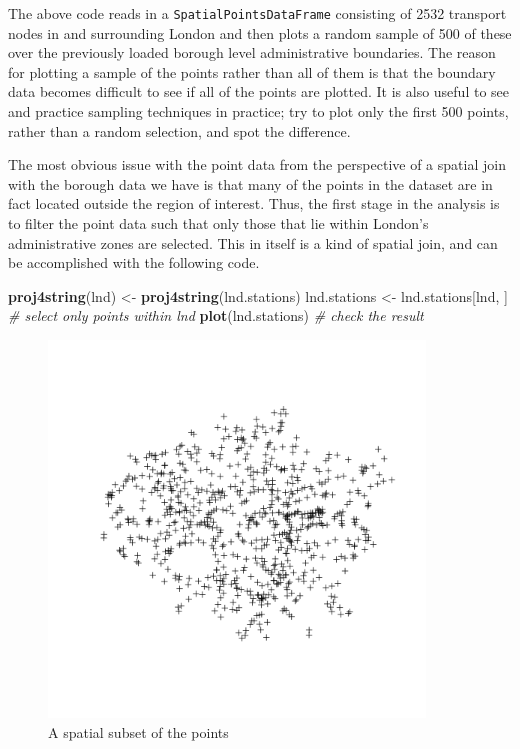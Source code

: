 \documentclass[]{article}
\newenvironment{Shaded}{}{}
\newcommand{\KeywordTok}[1]{\textcolor[rgb]{0.00,0.44,0.13}{\textbf{{#1}}}}
\newcommand{\CommentTok}[1]{\textcolor[rgb]{0.38,0.63,0.69}{\textit{{#1}}}}
\newcommand{\NormalTok}[1]{{#1}}
\let\Oldincludegraphics\includegraphics
\renewcommand{\includegraphics}[1]{\Oldincludegraphics[width=10cm]{#1}}
\begin{document}
The above code reads in a \texttt{SpatialPointsDataFrame} consisting of
2532 transport nodes in and surrounding London and then plots a random
sample of 500 of these over the previously loaded borough level
administrative boundaries. The reason for plotting a sample of the
points rather than all of them is that the boundary data becomes
difficult to see if all of the points are plotted. It is also useful to
see and practice sampling techniques in practice; try to plot only the
first 500 points, rather than a random selection, and spot the
difference.

The most obvious issue with the point data from the perspective of a
spatial join with the borough data we have is that many of the points in
the dataset are in fact located outside the region of interest. Thus,
the first stage in the analysis is to filter the point data such that
only those that lie within London's administrative zones are selected.
This in itself is a kind of spatial join, and can be accomplished with
the following code.

\begin{Shaded}
\begin{Highlighting}[]
\KeywordTok{proj4string}\NormalTok{(lnd) <- }\KeywordTok{proj4string}\NormalTok{(lnd.stations)}
\NormalTok{lnd.stations <- lnd.stations[lnd, ]  }\CommentTok{# select only points within lnd}
\KeywordTok{plot}\NormalTok{(lnd.stations)  }\CommentTok{# check the result}
\end{Highlighting}
\end{Shaded}
\begin{figure}[htbp]
\centering
\includegraphics{figure/A_spatial_subset_of_the_points.png}
\caption{A spatial subset of the points}
\end{figure}
\end{document}
